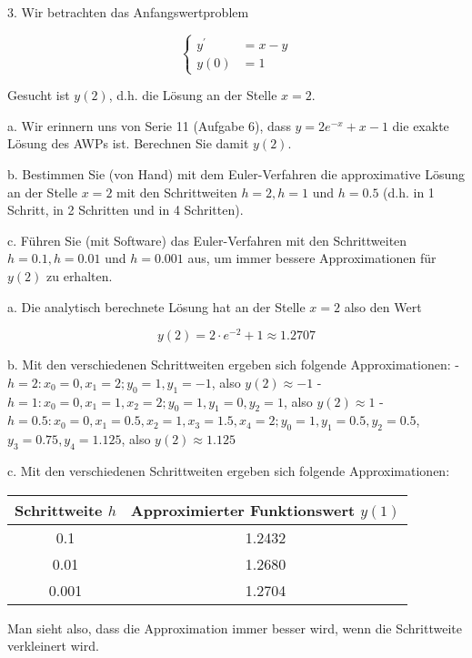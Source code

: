 \begin{example}
    3. Wir betrachten das Anfangswertproblem

    $$
    \left\{\begin{aligned}
    y^{\prime} & =x-y \\
    y(0) & =1
    \end{aligned}\right.
    $$
    
    Gesucht ist $y(2)$, d.h. die Lösung an der Stelle $x=2$.
    
    a. Wir erinnern uns von Serie 11 (Aufgabe 6), dass $y=2 e^{-x}+x-1$ die exakte Lösung des AWPs ist. Berechnen Sie damit $y(2)$.
    
    b. Bestimmen Sie (von Hand) mit dem Euler-Verfahren die approximative Lösung an der Stelle $x=2$ mit den Schrittweiten $h=2, h=1$ und $h=0.5$ (d.h. in 1 Schritt, in 2 Schritten und in 4 Schritten).
    
    c. Führen Sie (mit Software) das Euler-Verfahren mit den Schrittweiten $h=0.1, h=0.01$ und $h=0.001$ aus, um immer bessere Approximationen für $y(2)$ zu erhalten.

\tcblower
a. Die analytisch berechnete Lösung hat an der Stelle $x=2$ also den Wert

$$
y(2)=2 \cdot e^{-2}+1 \approx 1.2707
$$

b. Mit den verschiedenen Schrittweiten ergeben sich folgende Approximationen:
- $h=2: x_{0}=0, x_{1}=2 ; y_{0}=1, y_{1}=-1$, also $y(2) \approx-1$
- $h=1: x_{0}=0, x_{1}=1, x_{2}=2 ; y_{0}=1, y_{1}=0, y_{2}=1$, also $y(2) \approx 1$
- $h=0.5: x_{0}=0, x_{1}=0.5, x_{2}=1, x_{3}=1.5, x_{4}=2 ; y_{0}=1, y_{1}=0.5, y_{2}=0.5$, $y_{3}=0.75, y_{4}=1.125$, also $y(2) \approx 1.125$

c. Mit den verschiedenen Schrittweiten ergeben sich folgende Approximationen:

\begin{tabular}{|c|c|}
\hline Schrittweite $h$ & Approximierter Funktionswert $y(1)$ \\
\hline \hline 0.1 & 1.2432 \\
\hline 0.01 & 1.2680 \\
\hline 0.001 & 1.2704 \\
\hline
\end{tabular}

Man sieht also, dass die Approximation immer besser wird, wenn die Schrittweite verkleinert wird.

\end{example}


